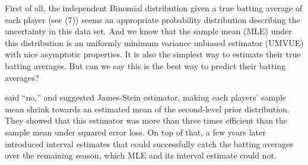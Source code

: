 \documentclass[article]{jss}
\begin{document}
First of all, the independent Binomial distribution given a true batting average of each player (see (7)) seems an appropriate probability distribution describing the uncertainty in this data set. And we know that the sample mean (MLE) under this distribution is an uniformly minimum variance unbiased estimator (UMVUE) with nice asymptotic properties. It is also the simplest way to estimate their true batting averages. But can we say this is the best way to predict their batting averages?


\cite{1975} said ``no,'' and suggested James-Stein estimator, making each players' sample mean shrink towards an estimated mean of the second-level prior distribution. They showed that this estimator was more than three times efficient than the sample mean under squared error loss. On top of that, a few years later \cite{1983} introduced interval estimates that could successfully catch the batting averages over the remaining season, which MLE and its interval estimate could not.
\end{document}
